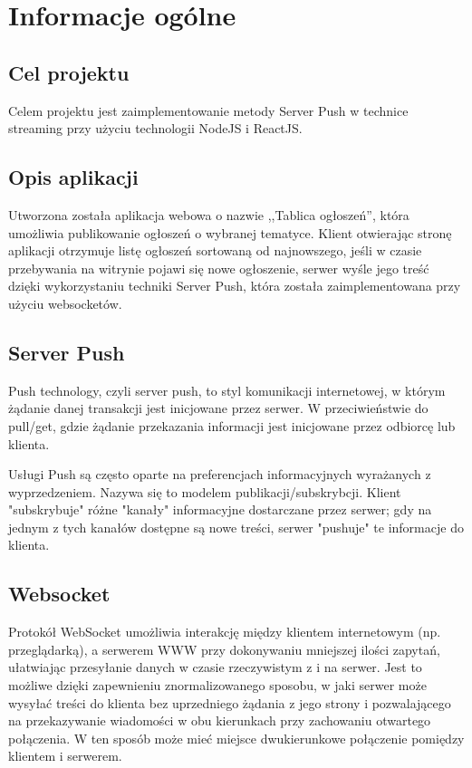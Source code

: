 \documentclass{sprawozdanie-agh}
\begin{document}
   


	\stronatytulowa{}
	\section{Informacje ogólne}
	
	\subsection{Cel projektu}
	Celem projektu jest zaimplementowanie metody Server Push w technice streaming przy użyciu technologii NodeJS i ReactJS.
	
	\subsection{Opis aplikacji}
	Utworzona została aplikacja webowa o nazwie ,,Tablica ogłoszeń'', która umożliwia publikowanie ogłoszeń o wybranej tematyce. Klient otwierając stronę aplikacji otrzymuje listę ogłoszeń sortowaną od najnowszego, jeśli w czasie przebywania na witrynie pojawi się nowe ogłoszenie, serwer wyśle jego treść dzięki wykorzystaniu techniki Server Push, która została zaimplementowana przy użyciu websocketów. 
	
	\subsection{Server Push}
	Push technology, czyli server push, to styl komunikacji internetowej, w którym żądanie danej transakcji jest inicjowane przez serwer. W przeciwieństwie do pull/get, gdzie żądanie przekazania informacji jest inicjowane przez odbiorcę lub klienta.
	
	Usługi Push są często oparte na preferencjach informacyjnych wyrażanych z wyprzedzeniem. Nazywa się to modelem publikacji/subskrybcji. Klient "subskrybuje" różne "kanały" informacyjne dostarczane przez serwer; gdy na jednym z tych kanałów dostępne są nowe treści, serwer "pushuje" te informacje do klienta.
	
	\subsection{Websocket}
	Protokół WebSocket umożliwia interakcję między klientem internetowym (np. przeglądarką), a serwerem WWW przy dokonywaniu mniejszej ilości zapytań, ułatwiając przesyłanie danych w czasie rzeczywistym z i na serwer. Jest to możliwe dzięki zapewnieniu znormalizowanego sposobu, w jaki serwer może wysyłać treści do klienta bez uprzedniego żądania z jego strony i pozwalającego na przekazywanie wiadomości w obu kierunkach przy zachowaniu otwartego połączenia. W ten sposób może mieć miejsce dwukierunkowe połączenie pomiędzy klientem i serwerem. 
	
\end{document}
